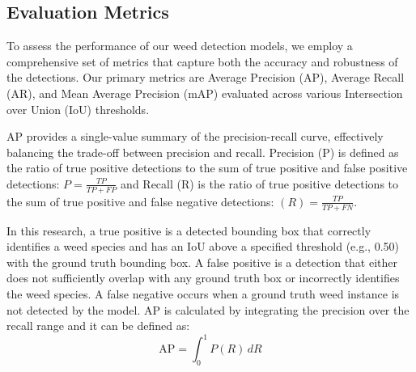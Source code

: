 


\subsection{Evaluation Metrics}

To assess the performance of our weed detection models, we employ a comprehensive set of metrics that capture both the accuracy and robustness of the detections. Our primary metrics are Average Precision (AP), Average Recall (AR), and Mean Average Precision (mAP) evaluated across various Intersection over Union (IoU) thresholds.

AP provides a single-value summary of the precision-recall curve, effectively balancing the trade-off between precision and recall. Precision (P) is defined as the ratio of true positive detections to the sum of true positive and false positive detections: $\text{} P = \frac{TP}{TP + FP}$ and Recall (R) is the ratio of true positive detections to the sum of true positive and false negative detections: $\text{} (R) = \frac{TP}{TP + FN}$.

In this research, a true positive is a detected bounding box that correctly identifies a weed species and has an IoU above a specified threshold (e.g., 0.50) with the ground truth bounding box. A false positive is a detection that either does not sufficiently overlap with any ground truth box or incorrectly identifies the weed species. A false negative occurs when a ground truth weed instance is not detected by the model. AP \cite{robertson2008new} is calculated by integrating the precision over the recall range and it can be defined as:
\vspace{-0.2cm}
\begin{equation}
\text{AP} = \int_0^1 P(R) \, dR
\end{equation}

